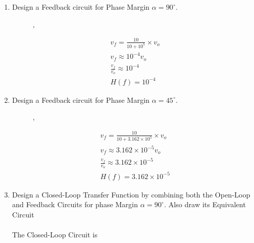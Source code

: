 \begin{enumerate}[label=\thesection.\arabic*.,ref=\thesection.\theenumi]
\item Design a Feedback circuit for Phase Margin $\alpha=90^{\circ}$.\\
\solution
\begin{figure}[ht!]
	\begin{center}
		\resizebox{\columnwidth/2}{!}{}
	\end{center},
	\caption{}
	\label{fig:ee18btech11014_alpha=45}
\end{figure}
\begin{align}
v_{f} = \frac{10}{10 + 10^{5}} \times v_{o}\\
v_{f} \approx 10^{-4} v_{o}\\
\frac{v_{f}}{v_{o}} \approx 10^{-4}\\
H(f) = 10^{-4}
\end{align}

\item Design a Feedback circuit for Phase Margin $\alpha=45^{\circ}$.\\
\solution
\begin{figure}[ht!]
	\begin{center}
		\resizebox{\columnwidth/2}{!}{}
	\end{center},
	\caption{}
	\label{fig:ee18btech11014_alpha=90}
\end{figure}
\begin{align}
v_{f} = \frac{10}{10 + 3.162\times 10^{5}} \times v_{o}\\
v_{f} \approx 3.162\times 10^{-5} v_{o}\\
\frac{v_{f}}{v_{o}} \approx 3.162\times 10^{-5}\\
H(f) = 3.162\times 10^{-5}
\end{align}

\item  Design a Closed-Loop Transfer Function by combining both the Open-Loop and Feedback Circuits for phase Margin $\alpha=90^{\circ}$. Also draw its Equivalent Circuit\\
\solution\\
The Closed-Loop Circuit is
\begin{figure}[ht!]
	\begin{center}
		\resizebox{\columnwidth}{!}{}
	\end{center}
	\caption{}
	\label{fig:ee18btech11014_Closed-Loop Circuit}
\end{figure}


\end{enumerate}
